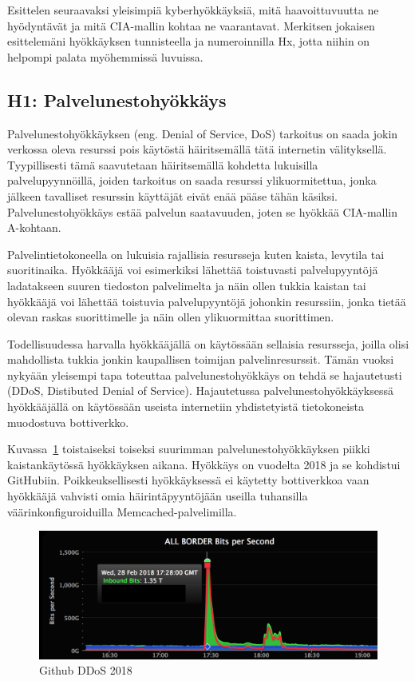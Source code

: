 Esittelen seuraavaksi yleisimpiä kyberhyökkäyksiä, mitä haavoittuvuutta ne hyödyntävät ja mitä CIA-mallin kohtaa ne vaarantavat. Merkitsen jokaisen esittelemäni hyökkäyksen tunnisteella ja numeroinnilla Hx, jotta niihin on helpompi palata myöhemmissä luvuissa.

\subsection{H1: Palvelunestohyökkäys}
Palvelunestohyökkäyksen (eng. Denial of Service, DoS) tarkoitus on saada jokin verkossa oleva resurssi pois käytöstä häiritsemällä tätä internetin välityksellä. Tyypillisesti tämä saavutetaan häiritsemällä kohdetta lukuisilla palvelupyynnöillä, joiden tarkoitus on saada resurssi ylikuormitettua, jonka jälkeen tavalliset resurssin käyttäjät eivät enää pääse tähän käsiksi. Palvelunestohyökkäys estää palvelun saatavuuden, joten se hyökkää CIA-mallin A-kohtaan.

Palvelintietokoneella on lukuisia rajallisia resursseja kuten kaista, levytila tai suoritinaika. Hyökkääjä voi esimerkiksi lähettää toistuvasti palvelupyyntöjä ladatakseen suuren tiedoston palvelimelta ja näin ollen tukkia kaistan tai hyökkääjä voi lähettää toistuvia palvelupyyntöjä johonkin resurssiin, jonka tietää olevan raskas suorittimelle ja näin ollen ylikuormittaa suorittimen.

Todellisuudessa harvalla hyökkääjällä on käytössään sellaisia resursseja, joilla olisi mahdollista tukkia jonkin kaupallisen toimijan palvelinresurssit. Tämän vuoksi nykyään yleisempi tapa toteuttaa palvelunestohyökkäys on tehdä se hajautetusti (DDoS, Distibuted Denial of Service). Hajautetussa palvelunestohyökkäyksessä hyökkääjällä on käytössään useista internetiin yhdistetyistä tietokoneista muodostuva bottiverkko.~\cite{nist_ddos}

Kuvassa~\ref{github_ddos} toistaiseksi toiseksi suurimman palvelunestohyökkäyksen piikki kaistankäytössä hyökkäyksen aikana. Hyökkäys on vuodelta 2018 ja se kohdistui GitHubiin. Poikkeuksellisesti hyökkäyksessä ei käytetty bottiverkkoa vaan hyökkääjä vahvisti omia häirintäpyyntöjään useilla tuhansilla väärinkonfiguroiduilla Memcached-palvelimilla.~\cite{github_ddos}

\begin{figure}
\centering \includegraphics[width=1\textwidth]{kuvat/github_ddos.png}
\caption{Github DDoS 2018~\cite{github_ddos}}
\label{github_ddos} 
\end{figure}

